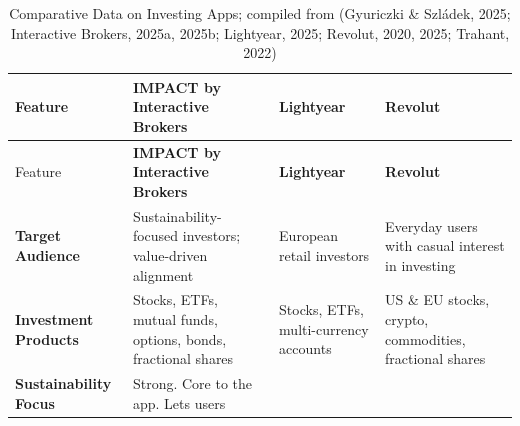 \documentclass[
  12pt,
  letterpaper,
  DIV=11,
  numbers=noendperiod]{scrartcl}
\begin{document}
\begin{longtable}[]{@{}
  >{\raggedright\arraybackslash}p{}
  >{\raggedright\arraybackslash}p{}
  >{\raggedright\arraybackslash}p{}
  >{\raggedright\arraybackslash}p{}@{}}
\caption[Comparative Data on Investing Apps]{Comparative Data on
Investing Apps; compiled from (Gyuriczki \& Szládek, 2025; Interactive
Brokers, 2025a, 2025b; Lightyear, 2025; Revolut, 2020, 2025; Trahant,
2022)}\tabularnewline
\toprule\noalign{}
\begin{minipage}[b]{\linewidth}\raggedright
Feature
\end{minipage} & \begin{minipage}[b]{\linewidth}\raggedright
\textbf{IMPACT by Interactive Brokers}
\end{minipage} & \begin{minipage}[b]{\linewidth}\raggedright
\textbf{Lightyear}
\end{minipage} & \begin{minipage}[b]{\linewidth}\raggedright
\textbf{Revolut}
\end{minipage} \\
\midrule\noalign{}
\endfirsthead
\toprule\noalign{}
\begin{minipage}[b]{\linewidth}\raggedright
Feature
\end{minipage} & \begin{minipage}[b]{\linewidth}\raggedright
\textbf{IMPACT by Interactive Brokers}
\end{minipage} & \begin{minipage}[b]{\linewidth}\raggedright
\textbf{Lightyear}
\end{minipage} & \begin{minipage}[b]{\linewidth}\raggedright
\textbf{Revolut}
\end{minipage} \\
\midrule\noalign{}
\endhead
\bottomrule\noalign{}
\endlastfoot
\textbf{Target Audience} & Sustainability-focused investors;
value-driven alignment & European retail investors & Everyday users with
casual interest in investing \\
\textbf{Investment Products} & Stocks, ETFs, mutual funds, options,
bonds, fractional shares & Stocks, ETFs, multi-currency accounts & US \&
EU stocks, crypto, commodities, fractional shares \\
\textbf{Sustainability Focus} & Strong. Core to the app. Lets users

\end{longtable}
\end{document}
